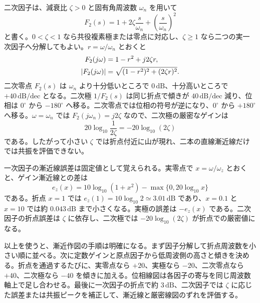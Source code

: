 二次因子は、減衰比 $\zeta>0$ と固有角周波数 $\omega_n$ を用いて
\begin{equation}
  F_2(s)=1+2\zeta\frac{s}{\omega_n}
    +\left(\frac{s}{\omega_n}\right)^2
\end{equation}
と書く。$0<\zeta<1$ なら共役複素極または零点に対応し、$\zeta\ge1$ なら二つの実一次因子へ分解してもよい。$r=\omega/\omega_n$ とおくと
\begin{align}
  F_2(j\omega)
    &=1-r^2+j2\zeta r,\\
  \left|F_2(j\omega)\right|
    &=\sqrt{(1-r^2)^2+(2\zeta r)^2}.
\end{align}
二次零点 $F_2(s)$ は $\omega_n$ より十分低いところで $0\,\mathrm{dB}$、十分高いところで $+40\,\mathrm{dB/dec}$ となる。二次極 $1/F_2(s)$ は同じ折点で傾きが $40\,\mathrm{dB/dec}$ 減り、位相は $0^\circ$ から $-180^\circ$ へ移る。二次零点では位相の符号が逆になり、$0^\circ$ から $+180^\circ$ へ移る。$\omega=\omega_n$ では $F_2(j\omega_n)=j2\zeta$ なので、二次極の厳密なゲインは
\begin{equation}
  20\log_{10}\frac{1}{2\zeta}
  =-20\log_{10}(2\zeta)
\end{equation}
である。したがって小さい $\zeta$ では折点付近に山が現れ、二本の直線漸近線だけでは共振を評価できない。

一次因子の漸近線誤差は固定値として覚えられる。実零点で $x=\omega/\omega_z$ とおくと、ゲイン漸近線との差は
\begin{equation}
  e_z(x)=10\log_{10}(1+x^2)-\max\{0,20\log_{10}x\}
\end{equation}
である。折点 $x=1$ では $e_z(1)=10\log_{10}2\simeq3.01\,\mathrm{dB}$ であり、$x=0.1$ と $x=10$ では約 $0.043\,\mathrm{dB}$ まで小さくなる。実極の誤差は $-e_z(x)$ である。二次因子の折点誤差は $\zeta$ に依存し、二次極では $-20\log_{10}(2\zeta)$ が折点での厳密値になる。

以上を使うと、漸近作図の手順は明確になる。まず因子分解して折点周波数を小さい順に並べる。次に定数ゲインと原点因子から低周波側の高さと傾きを決める。折点を通過するたびに、実零点なら $+20$、実極なら $-20$、二次零点なら $+40$、二次極なら $-40$ を傾きに加える。位相線図は各因子の寄与を同じ周波数軸上で足し合わせる。最後に一次因子の折点で約 $3\,\mathrm{dB}$、二次因子では $\zeta$ に応じた誤差または共振ピークを補正して、漸近線と厳密線図のずれを評価する。

